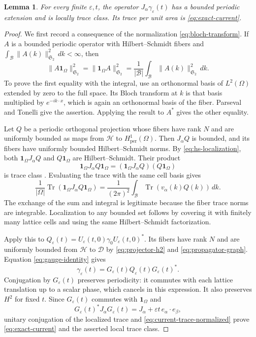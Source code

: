 \documentclass[11pt,a4paper]{article}
\newcommand{\B}{\mathcal B}
\newcommand{\HH}{\mathscr H}
\newcommand{\DD}{\mathscr D}
\newcommand{\one}{\mathbf 1}
\newcommand{\norm}[1]{\lVert #1\rVert}
\newcommand{\cB}{\frac{1}{(2\pi)^2}}
\DeclareMathOperator{\Tr}{Tr}
\newtheorem{lemma}[lemma]{Lemma}
\numberwithin{equation}{section}
\begin{document}
\begin{lemma}\label{lem:local-trace}
For every finite $\varepsilon,t$, the operator
$J_\alpha\gamma_\varepsilon(t)$ has a bounded periodic extension and
is locally trace class. Its trace per unit area is
\eqref{eq:exact-current}.
\end{lemma}

\begin{proof}
We first record a consequence of the normalization
\eqref{eq:bloch-transform}. If $A$ is a bounded periodic operator with
Hilbert--Schmidt fibers and
$\int_\B\norm{A(k)}_{\mathfrak S_2}^2\,dk<\infty$, then
\begin{equation}\label{eq:hs-localization}
 \norm{A\one_\Omega}_{\mathfrak S_2}^2
 =\norm{\one_\Omega A}_{\mathfrak S_2}^2
 =\frac1{|\B|}\int_\B\norm{A(k)}_{\mathfrak S_2}^2\,dk.
\end{equation}
To prove the first equality with the integral, use an orthonormal
basis of $L^2(\Omega)$ extended by zero to the full space. Its Bloch
transform at $k$ is that basis multiplied by $e^{-ik\cdot x}$, which
is again an orthonormal basis of the fiber. Parseval and Tonelli give
the assertion. Applying the result to $A^*$ gives the other equality.

Let $Q$ be a periodic orthogonal projection whose fibers have rank $N$
and are uniformly bounded as maps from $\HH$ to
$H^1_{\mathrm{per}}(\Omega)$. Then $J_\alpha Q$ is
bounded, and its fibers have uniformly bounded Hilbert--Schmidt norms.
By \eqref{eq:hs-localization}, both $\one_\Omega J_\alpha Q$ and
$Q\one_\Omega$ are Hilbert--Schmidt. Their product
\[
 \one_\Omega J_\alpha Q\one_\Omega
 =(\one_\Omega J_\alpha Q)(Q\one_\Omega)
\]
is trace class \cite[Theorem VI.22(h)]{RS1}. Evaluating the trace with
the same cell basis gives
\begin{equation}\label{eq:current-trace-normalized}
 \frac1{|\Omega|}\Tr(\one_\Omega J_\alpha Q\one_\Omega)
 =\cB\int_\B\Tr(v_\alpha(k)Q(k))\,dk.
\end{equation}
The exchange of the sum and integral is legitimate because the fiber
trace norms are integrable. Localization to any bounded set follows
by covering it with finitely many lattice cells and using the same
Hilbert--Schmidt factorization.

Apply this to
$Q_\varepsilon(t)=U_\varepsilon(t,0)\gamma_0U_\varepsilon(t,0)^*$.
Its fibers have rank $N$ and are uniformly bounded from $\HH$ to $\DD$ by
\eqref{eq:projector-h2} and \eqref{eq:propagator-graph}.
Equation \eqref{eq:gauge-identity} gives
\[
 \gamma_\varepsilon(t)
 =G_\varepsilon(t)Q_\varepsilon(t)G_\varepsilon(t)^*.
\]
Conjugation by $G_\varepsilon(t)$ preserves periodicity: it commutes
with each lattice translation up to a scalar phase, which cancels in
this expression. It also preserves $H^2$ for fixed $t$. Since
$G_\varepsilon(t)$ commutes with $\one_\Omega$ and
\[
 G_\varepsilon(t)^*J_\alpha G_\varepsilon(t)
 =J_\alpha+\varepsilon t\,e_\alpha\cdot e_\beta,
\]
unitary conjugation of the localized trace and
\eqref{eq:current-trace-normalized} prove
\eqref{eq:exact-current} and the asserted local trace class.
\end{proof}
\end{document}
